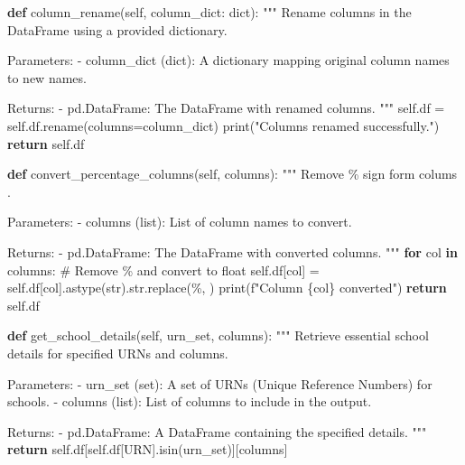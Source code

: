 \documentclass[
  letterpaper,
  DIV=11,
  numbers=noendperiod]{scrartcl}
\newenvironment{Shaded}{\begin{snugshade}}{\end{snugshade}}
\newcommand{\BuiltInTok}[1]{\textcolor[rgb]{0.00,0.23,0.31}{#1}}
\newcommand{\CommentTok}[1]{\textcolor[rgb]{0.37,0.37,0.37}{#1}}
\newcommand{\ControlFlowTok}[1]{\textcolor[rgb]{0.00,0.23,0.31}{\textbf{#1}}}
\newcommand{\KeywordTok}[1]{\textcolor[rgb]{0.00,0.23,0.31}{\textbf{#1}}}
\newcommand{\NormalTok}[1]{\textcolor[rgb]{0.00,0.23,0.31}{#1}}
\newcommand{\OperatorTok}[1]{\textcolor[rgb]{0.37,0.37,0.37}{#1}}
\newcommand{\SpecialCharTok}[1]{\textcolor[rgb]{0.37,0.37,0.37}{#1}}
\newcommand{\SpecialStringTok}[1]{\textcolor[rgb]{0.13,0.47,0.30}{#1}}
\newcommand{\StringTok}[1]{\textcolor[rgb]{0.13,0.47,0.30}{#1}}
\newcommand{\VariableTok}[1]{\textcolor[rgb]{0.07,0.07,0.07}{#1}}
\begin{document}
\begin{Shaded}
\begin{Highlighting}[]
    \KeywordTok{def}\NormalTok{ column\_rename(}\VariableTok{self}\NormalTok{, column\_dict: }\BuiltInTok{dict}\NormalTok{):}
        \CommentTok{"""}
\CommentTok{        Rename columns in the DataFrame using a provided dictionary.}

\CommentTok{        Parameters:}
\CommentTok{        {-} column\_dict (dict): A dictionary mapping original column names to new names.}

\CommentTok{        Returns:}
\CommentTok{        {-} pd.DataFrame: The DataFrame with renamed columns.}
\CommentTok{        """}
        \VariableTok{self}\NormalTok{.df }\OperatorTok{=} \VariableTok{self}\NormalTok{.df.rename(columns}\OperatorTok{=}\NormalTok{column\_dict)}
        \BuiltInTok{print}\NormalTok{(}\StringTok{"Columns renamed successfully."}\NormalTok{)}
        \ControlFlowTok{return} \VariableTok{self}\NormalTok{.df}

    
    \KeywordTok{def}\NormalTok{ convert\_percentage\_columns(}\VariableTok{self}\NormalTok{, columns):}
        \CommentTok{"""}
\CommentTok{        Remove \% sign form colums .}

\CommentTok{        Parameters:}
\CommentTok{        {-} columns (list): List of column names to convert.}

\CommentTok{        Returns:}
\CommentTok{        {-} pd.DataFrame: The DataFrame with converted columns.}
\CommentTok{        """}
        \ControlFlowTok{for}\NormalTok{ col }\KeywordTok{in}\NormalTok{ columns:}
            \CommentTok{\# Remove \textquotesingle{}\%\textquotesingle{} and convert to float}
            \VariableTok{self}\NormalTok{.df[col] }\OperatorTok{=} \VariableTok{self}\NormalTok{.df[col].astype(}\BuiltInTok{str}\NormalTok{).}\BuiltInTok{str}\NormalTok{.replace(}\StringTok{\textquotesingle{}\%\textquotesingle{}}\NormalTok{, }\StringTok{\textquotesingle{}\textquotesingle{}}\NormalTok{)}
            \BuiltInTok{print}\NormalTok{(}\SpecialStringTok{f"Column \textquotesingle{}}\SpecialCharTok{\{}\NormalTok{col}\SpecialCharTok{\}}\SpecialStringTok{\textquotesingle{} converted"}\NormalTok{)}
        \ControlFlowTok{return} \VariableTok{self}\NormalTok{.df}

  
    \KeywordTok{def}\NormalTok{ get\_school\_details(}\VariableTok{self}\NormalTok{, urn\_set, columns):}
        \CommentTok{""" }
\CommentTok{        Retrieve essential school details for specified URNs and columns.}

\CommentTok{        Parameters:}
\CommentTok{        {-} urn\_set (set): A set of URNs (Unique Reference Numbers) for schools.}
\CommentTok{        {-} columns (list): List of columns to include in the output.}

\CommentTok{        Returns:}
\CommentTok{        {-} pd.DataFrame: A DataFrame containing the specified details.}
\CommentTok{        """}
        \ControlFlowTok{return} \VariableTok{self}\NormalTok{.df[}\VariableTok{self}\NormalTok{.df[}\StringTok{\textquotesingle{}URN\textquotesingle{}}\NormalTok{].isin(urn\_set)][columns]}
\end{Highlighting}
\end{Shaded}
\end{document}
